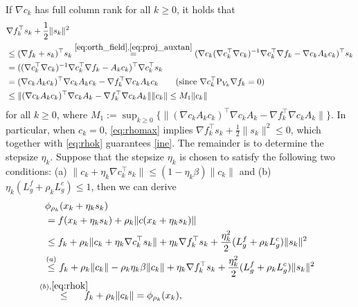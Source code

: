 \documentclass[11pt]{article}
\def\red#1{\textcolor{red}{#1}}
\newcommand{\be}{\begin{equation}}
\newcommand{\ee}{\end{equation}}
\begin{document}
If $\nabla c_k$ has full column rank for all $k\ge0$, it holds that
\be \label{eq:rhomax}
\begin{aligned}
    &\nabla f_k^\top s_k + \frac{1}{2}\|s_k\|^2 \\
    &\leq (\nabla f_k + s_k)^\top s_k \overset{\eqref{eq:orth_field},\eqref{eq:proj_auxtan}}{=} (\nabla c_k (\nabla c_k^{\top} \nabla c_k)^{-1} \nabla c_k^{\top} \nabla f_k - \nabla c_k A_k c_k)^\top s_k\\
    & = ( (\nabla c_k^\top \nabla c_k)^{-1} \nabla c_k^\top \nabla f_k - A_k c_k)^\top \nabla c_k^\top s_k\\
    & = (\nabla c_k A_k c_k)^\top \nabla c_k A_k c_k - \nabla f_k^\top \nabla c_k A_k c_k \qquad ({\rm since}~\nabla c_k^\top {\rm P}_{V_k} \nabla f_k = 0)\\
    & \leq \|(\nabla c_k A_k c_k)^\top \nabla c_k A_k - \nabla f_k^\top \nabla c_k A_k \| \|c_k\| \leq M_1 \|c_k\| 
\end{aligned}\ee
for all $k\ge0$, 
where \(M_1 := \sup_{k \ge 0} \{\|(\nabla c_k A_k c_k)^\top \nabla c_k A_k - \nabla f_k^\top \nabla c_k A_k \|\}\). In particular, when $c_k=0$, \eqref{eq:rhomax} implies $\nabla f_k^\top s_k + \frac{1}{2}\|s_k\|^2\le 0$, which together with \eqref{eq:rhok}  guarantees \eqref{ine}. 
The remainder is to determine the stepsize $\eta_k$.  
Suppose that the stepsize $\eta_k$ is chosen to satisfy the following two conditions: 
(a) \(\|c_k + \eta_k \nabla c_k^\top s_k\| \leq (1 - \eta_k \beta) \|c_k\|\) and 
(b) \(\eta_k (L_g^f + \rho_k L_g^c) \leq 1\), then we can derive
\be\begin{aligned}\label{eq:merit-descent}
   & \phi_{\rho_k}(x_k + \eta_k s_k)\\ &= f(x_k+\eta_k s_k) + \rho_k \|c(x_k+\eta_k s_k)\|\\
    &\leq f_k + \rho_k \|c_k + \eta_k \nabla c_k^\top s_k \| + \eta_k \nabla f_k^\top s_k + \frac{\eta_k^2}{2} (L_g^f+\rho_k L_g^c)\|s_k\|^2\\
    &\!\overset{(a)}{\leq} f_k + \rho_k \|c_k \| - \rho_k \eta_k \beta \| c_k \| + \eta_k \nabla f_k^\top s_k + \frac{\eta_k^2}{2} (L_g^f+\rho_k L_g^c)\|s_k\|^2\\
    &\!\!\!\!\!\overset{(b),\eqref{eq:rhok}}{\leq}\!\!\!\! f_k + \rho_k \|c_k \| = \phi_{\rho_k}(x_k) ,
\end{aligned}\ee
\end{document}
